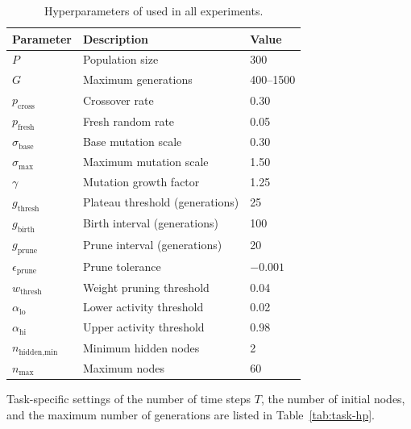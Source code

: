 \begin{table}[h]
  \centering
  \small
  \caption{Hyperparameters of \modnet{} used in all experiments.}
  \label{tab:hp-setup}
  \begin{tabular}{lll}
    \toprule
    \textbf{Parameter} & \textbf{Description} & \textbf{Value} \\
    \midrule
    $P$                & Population size                    & 300 \\
    $G$                & Maximum generations                & 400--1500 \\
    $p_{\text{cross}}$ & Crossover rate                     & 0.30 \\
    $p_{\text{fresh}}$ & Fresh random rate                  & 0.05 \\
    $\sigma_{\text{base}}$ & Base mutation scale           & 0.30 \\
    $\sigma_{\max}$    & Maximum mutation scale             & 1.50 \\
    $\gamma$           & Mutation growth factor             & 1.25 \\
    $g_{\text{thresh}}$& Plateau threshold (generations)    & 25 \\
    $g_{\text{birth}}$ & Birth interval (generations)       & 100 \\
    $g_{\text{prune}}$ & Prune interval (generations)       & 20 \\
    $\epsilon_{\text{prune}}$ & Prune tolerance             & $-0.001$ \\
    $w_{\text{thresh}}$& Weight pruning threshold           & 0.04 \\
    $\alpha_{\text{lo}}$& Lower activity threshold          & 0.02 \\
    $\alpha_{\text{hi}}$& Upper activity threshold          & 0.98 \\
    $n_{\text{hidden,min}}$& Minimum hidden nodes          & 2 \\
    $n_{\max}$         & Maximum nodes                      & 60 \\
    \bottomrule
  \end{tabular}
\end{table}

Task-specific settings of the number of time steps $T$, the number of
initial nodes, and the maximum number of generations are listed in
Table~\ref{tab:task-hp}.

